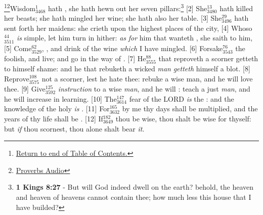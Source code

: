 \footnote{\textcolor[cmyk]{0.99998,1,0,0}{\hyperlink{TOC}{Return to end of Table of Contents.}}}\footnote{\href{https://audiobible.com/bible/bible.html}{\textcolor[cmyk]{0.99998,1,0,0}{Proverbs Audio}}}\textcolor[cmyk]{0.99998,1,0,0}{Wisdom\textcolor{jungle}{$_{3468}^{1}$} hath , she hath hewn out her seven pillars:}\footnote{\textbf{1 Kings 8:27} - But will God indeed dwell on the earth? behold, the heaven and heaven of heavens cannot contain thee; how much less this house that I have builded?} 
[2] \textcolor[cmyk]{0.99998,1,0,0}{She\textcolor{jungle}{$_{3480}^{13}$} hath killed her beasts; she hath mingled her wine; she hath also  her table.}
[3] \textcolor[cmyk]{0.99998,1,0,0}{She\textcolor{jungle}{$_{3496}^{29}$} hath sent forth her maidens: she crieth upon the highest places of the city,}
[4] \textcolor[cmyk]{0.99998,1,0,0}{Whoso\textcolor{jungle}{$_{3511}^{44}$} \emph{is} simple, let him turn in hither: \emph{as} \emph{for} him that wanteth , she saith to him,}
[5] \textcolor[cmyk]{0.99998,1,0,0}{Come\textcolor{jungle}{$_{3529}^{62}$},  , and drink of the wine \emph{which} I have mingled.}
[6] \textcolor[cmyk]{0.99998,1,0,0}{Forsake\textcolor{jungle}{$_{3543}^{76}$} the foolish, and live; and go in the way of .}
[7] \textcolor[cmyk]{0.99998,1,0,0}{He\textcolor{jungle}{$_{3555}^{88}$} that reproveth a scorner getteth to himself shame: and he that rebuketh a wicked \emph{man} \emph{getteth} himself a blot.}
[8] \textcolor[cmyk]{0.99998,1,0,0}{Reprove\textcolor{jungle}{$_{3575}^{108}$} not a scorner, lest he hate thee: rebuke a wise man, and he will love thee.}
[9] \textcolor[cmyk]{0.99998,1,0,0}{Give\textcolor{jungle}{$_{3592}^{125}$} \emph{instruction} to a wise \emph{man}, and he will : teach a just \emph{man}, and he will increase in learning.}
[10] \textcolor[cmyk]{0.99998,1,0,0}{The\textcolor{jungle}{$_{3614}^{147}$} fear of the LORD \emph{is} the : and the knowledge of the holy \emph{is} .}
[11] \textcolor[cmyk]{0.99998,1,0,0}{For\textcolor{jungle}{$_{3632}^{165}$} by me thy days shall be multiplied, and the years of thy life shall be .}
[12] \textcolor[cmyk]{0.99998,1,0,0}{If\textcolor{jungle}{$_{3649}^{182}$} thou be wise, thou shalt be wise for thyself: but \emph{if} thou scornest, thou alone shalt bear \emph{it}.}
